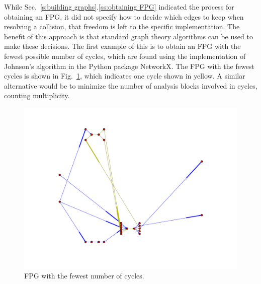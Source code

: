 	While Sec.~\ref{s:building graphs}.\ref{ss:obtaining FPG} indicated the process for obtaining an FPG, it did not specify how to decide which edges to keep when resolving a collision, that freedom is left to the specific implementation. The benefit of this approach is that standard graph theory algorithms can be used to make these decisions. The first example of this is to obtain an FPG with the fewest possible number of cycles, which are found using the implementation of Johnson's algorithm \cite{Johnson1975} in the Python package NetworkX. The FPG with the fewest cycles is shown in Fig.~\ref{f:FPG fewest cycles}, which indicates one cycle shown in yellow. A similar alternative would be to minimize the number of analysis blocks involved in cycles, counting multiplicity.
	\begin{figure}[htb!]
	  \begin{center}
		\includegraphics[width=.6\textwidth]{images/FPG_fewest_cycles}
	  \end{center}
	  \caption{FPG with the fewest number of cycles.}
	\label{f:FPG fewest cycles}
	\end{figure}

